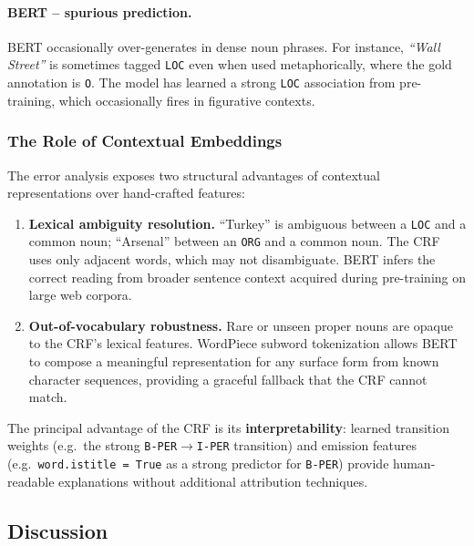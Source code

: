 \documentclass[11pt,a4paper]{article}
\begin{document}
\paragraph{BERT -- spurious prediction.}
BERT occasionally over-generates in dense noun phrases. For instance,
\emph{``Wall Street''} is sometimes tagged \texttt{LOC} even when used
metaphorically, where the gold annotation is \texttt{O}. The model has learned
a strong \texttt{LOC} association from pre-training, which occasionally fires
in figurative contexts.

\subsubsection{The Role of Contextual Embeddings}

The error analysis exposes two structural advantages of contextual
representations over hand-crafted features:

\begin{enumerate}[noitemsep]
    \item \textbf{Lexical ambiguity resolution.} ``Turkey'' is ambiguous
    between a \texttt{LOC} and a common noun; ``Arsenal'' between an
    \texttt{ORG} and a common noun. The CRF uses only adjacent words, which
    may not disambiguate. BERT infers the correct reading from broader
    sentence context acquired during pre-training on large web corpora.
    \item \textbf{Out-of-vocabulary robustness.} Rare or unseen proper nouns
    are opaque to the CRF's lexical features. WordPiece subword tokenization
    allows BERT to compose a meaningful representation for any surface form
    from known character sequences, providing a graceful fallback that the
    CRF cannot match.
\end{enumerate}

The principal advantage of the CRF is its \textbf{interpretability}: learned
transition weights (e.g.\ the strong \texttt{B-PER}$\to$\texttt{I-PER}
transition) and emission features (e.g.\ \texttt{word.istitle = True} as a
strong predictor for \texttt{B-PER}) provide human-readable explanations
without additional attribution techniques.

\subsection{Discussion}
\end{document}

